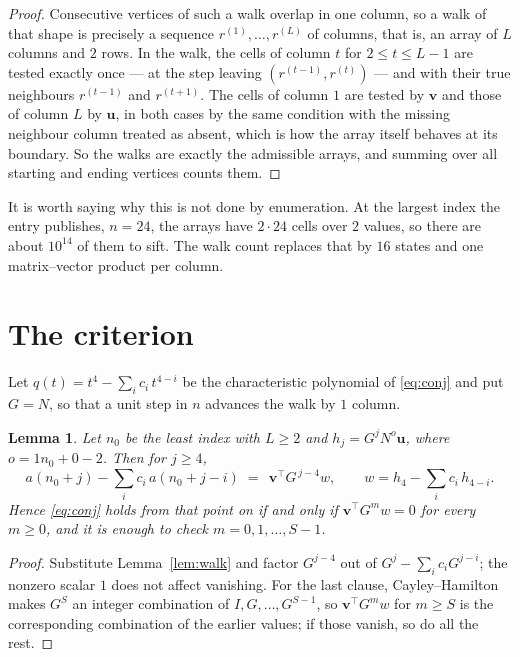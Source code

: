 \documentclass[11pt,a4paper]{article}
\theoremstyle{plain}
\newtheorem{lemma}[theorem]{Lemma}
\theoremstyle{definition}
\begin{document}
\begin{proof}
Consecutive vertices of such a walk overlap in one column, so a walk of that shape is
precisely a sequence $r^{(1)},\dots,r^{(L)}$ of columns, that is, an array of $L$ columns
and $2$ rows. In the walk, the cells of column $t$ for $2\le t\le L-1$ are tested
exactly once --- at the step leaving $(r^{(t-1)},r^{(t)})$ --- and with their true
neighbours $r^{(t-1)}$ and $r^{(t+1)}$. The cells of column $1$ are tested by
$\mathbf{v}$ and those of column $L$ by $\mathbf{u}$, in both cases by the same condition
with the missing neighbour column treated as absent, which is how the array itself behaves at
its boundary. So the walks are exactly the admissible arrays, and summing over all starting
and ending vertices counts them.
\end{proof}


It is worth saying why this is not done by enumeration. At the largest index the entry
publishes, $n=24$, the arrays have $2\cdot24$ cells over
$2$ values, so there are about $10^{14}$ of them to sift. The
walk count replaces that by $16$ states and one matrix--vector product per column.
\section{The criterion}

Let $q(t)=t^{4}-\sum_i c_i\,t^{4-i}$ be the characteristic polynomial of
\eqref{eq:conj} and put $G=N$, so that a unit step in $n$ advances the walk by
$1$ column.

\begin{lemma}\label{lem:crit}
Let $n_0$ be the least index with $L\ge2$ and $h_j=G^{j}N^{o}\mathbf{u}$, where
$o=1n_0+0-2$. Then for $j\ge4$,
\[
a(n_0+j)-\sum_i c_i\,a(n_0+j-i)\;=\;\,\mathbf{v}^{\!\top}G^{\,j-4}w,
\qquad w=h_{4}-\sum_i c_i\,h_{4-i} .
\]
Hence \eqref{eq:conj} holds from that point on if and only if
$\mathbf{v}^{\!\top}G^{m}w=0$ for every $m\ge0$, and it is enough to check
$m=0,1,\dots,S-1$.
\end{lemma}

\begin{proof}
Substitute Lemma~\ref{lem:walk} and factor $G^{j-4}$ out of
$G^{j}-\sum_ic_iG^{j-i}$; the nonzero scalar $1$ does not affect
vanishing. For the last clause, Cayley--Hamilton makes $G^{S}$ an integer combination of
$I,G,\dots,G^{S-1}$, so $\mathbf{v}^{\!\top}G^{m}w$ for $m\ge S$ is the corresponding
combination of the earlier values; if those vanish, so do all the rest.
\end{proof}
\end{document}
